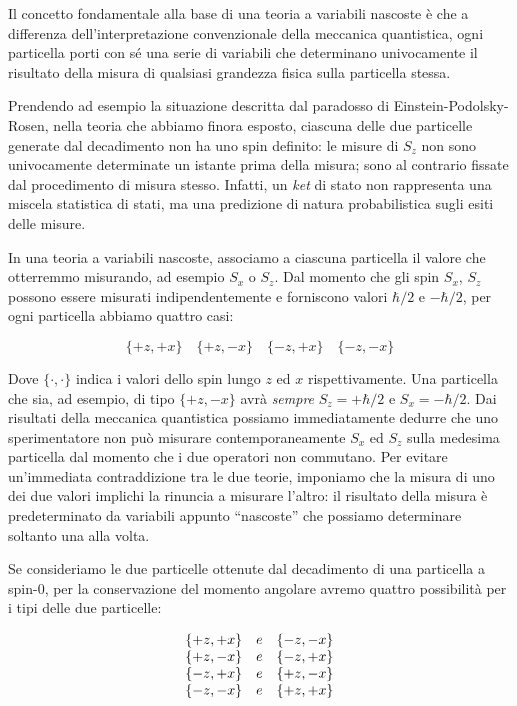Il concetto fondamentale alla base di una teoria a variabili nascoste \`e che a differenza dell'interpretazione convenzionale della meccanica quantistica, ogni particella porti con s\'e una serie di variabili che determinano univocamente il risultato della misura di qualsiasi grandezza fisica sulla particella stessa.

Prendendo ad esempio la situazione descritta dal paradosso di Einstein-Podolsky-Rosen, nella teoria che abbiamo finora esposto, ciascuna delle due particelle generate dal decadimento non ha uno spin definito: le misure di $S_z$ non sono univocamente determinate un istante prima della misura; sono al contrario fissate dal procedimento di misura stesso. Infatti, un \textit{ket} di stato non rappresenta una miscela statistica di stati, ma una predizione di natura probabilistica sugli esiti delle misure.

In una teoria a variabili nascoste, associamo a ciascuna particella il valore che otterremmo misurando, ad esempio $S_x$ o $S_z$. Dal momento che gli spin $S_x$, $S_z$ possono essere misurati indipendentemente e forniscono valori $\hbar / 2$ e $-\hbar / 2$, per ogni particella abbiamo quattro casi:

	\begin{equation}
		\{ +z, +x \} \quad \{ +z, -x \} \quad \{ -z, +x \} \quad \{ -z, -x \}
	\end{equation}

Dove $\{ \cdot, \cdot \} $ indica i valori dello spin lungo $z$ ed $x$ rispettivamente. Una particella che sia, ad esempio, di tipo $\{ +z, -x \}$ avr\`a \textit{sempre} $S_z = + \hbar / 2$ e $S_x = - \hbar / 2$. Dai risultati della meccanica quantistica possiamo immediatamente dedurre che uno sperimentatore non pu\`o misurare contemporaneamente $S_x$ ed $S_z$ sulla medesima particella dal momento che i due operatori non commutano. Per evitare un'immediata contraddizione tra le due teorie, imponiamo che la misura di uno dei due valori implichi la rinuncia a misurare l'altro: il risultato della misura \`e predeterminato da variabili appunto ``nascoste'' che possiamo determinare soltanto una alla volta.

Se consideriamo le due particelle ottenute dal decadimento di una particella a spin-0, per la conservazione del momento angolare avremo quattro possibilit\`a per i tipi delle due particelle:

	\begin{equation}
		\begin{array}{c c c}
			\{ +z, +x \} & e & \{ -z, -x \} \\
			\{ +z, -x \} & e & \{ -z, +x \} \\
			\{ -z, +x \} & e & \{ +z, -x \} \\
			\{ -z, -x \} & e & \{ +z, +x \} \\
		\end{array}
	\end{equation}

